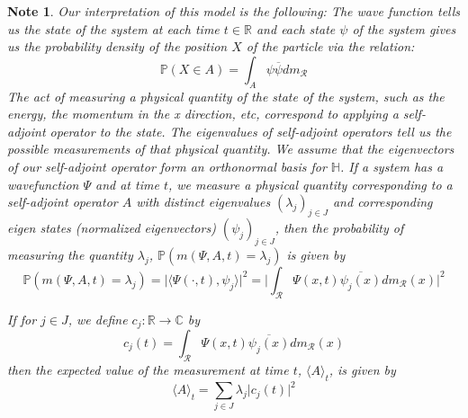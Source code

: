 \documentclass[12pt]{amsart}
\newtheorem{note}[thm]{Note}
\renewcommand{\r}{\rangle}
\renewcommand{\l}{\langle}
\newcommand{\lam}{\lambda}
\newcommand{\C}{\mathbb{C}}
\renewcommand{\H}{\mathbb{H}}
\newcommand{\R}{\mathbb{R}}
\renewcommand{\P}{\mathbb{P}}
\renewcommand{\MR}{\mathcal{R}}
\begin{document}
\begin{note}
Our interpretation of this model is the following: The wave function tells us the state of the system at each time $t \in \R$ and each state $\psi$ of the system gives us the probability density of the position $X$ of the particle via the relation: $$\P(X \in A) = \int_{A} \psi \overline{\psi} dm_{\MR}$$  The act of measuring a physical quantity of the state of the system, such as the energy, the momentum in the x direction, etc, correspond to applying a self-adjoint operator to the state. The eigenvalues of self-adjoint operators tell us the possible measurements of that physical quantity. We assume that the eigenvectors of our self-adjoint operator form an orthonormal basis for $\H$. If a system has a wavefunction $\Psi$ and at time $t$, we measure a physical quantity corresponding to a self-adjoint operator $A$ with distinct eigenvalues $(\lambda_j)_{j \in J}$ and corresponding eigen states (normalized eigenvectors) $(\psi_j)_{j \in J}$, then the probability of measuring the quantity $\lam_j$, $\P(m(\Psi, A, t) =\lam_j)$ is given by $$\P(m(\Psi, A, t) = \lam_j) = \vert \l \Psi(\cdot, t), \psi_j \r \vert ^2 = \bigg \vert \int_{\MR} \Psi(x, t)\overline{\psi_j(x)} dm_{\MR}(x) \bigg\vert ^2$$ 

If for $j \in J$, we define $c_j: \R \rightarrow \C$ by $$c_j(t) = \int_{\MR} \Psi(x, t)\overline{\psi_j(x)} dm_{\MR}(x)$$ then the expected value of the measurement at time $t$, $\l A \r_t$, is given by $$\l A \r_t = \sum_{j \in J}\lam_j \vert c_j(t) \vert ^2$$
\end{note}
\end{document}
